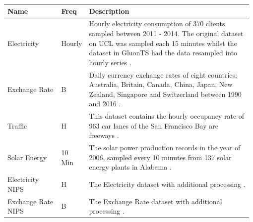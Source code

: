 \begin{table}[h]
    \centering
    \begin{tabular}{p{0.22\linewidth} | p{0.09\linewidth} | p{0.67\linewidth}}
        Name               & Freq   & Description                                                                                                                                                                                                                                                       \\ \hline
        Electricity        & Hourly & Hourly electricity consumption of 370 clients sampled between 2011 - 2014. The original dataset on UCL was sampled each 15 minutes whilst the dataset in GluonTS had the data resampled into hourly series \cite{gluonts-website, salinas_high-dimensional_2019}. \\
        \hline
        Exchange Rate      & B      & Daily currency exchange rates of eight countries; Australia, Britain, Canada, China, Japan, New Zealand, Singapore and Switzerland between 1990 and 2016  \cite{lai_modeling_2018}.                                                                               \\
        \hline
        Traffic            & H      & This dataset contains the hourly occupancy rate of 963 car lanes of the San Francisco Bay are freeways \cite{gluonts-github}.                                                                                                                                     \\
        \hline
        Solar Energy       & 10 Min & The solar power production records in the year of 2006, sampled every 10 minutes from 137 solar energy plants in Alabama \cite{lai_modeling_2018}.                                                                                                                \\
        \hline
        Electricity NIPS   & H      & The Electricity dataset with additional processing \cite{salinas_high-dimensional_2019}.                                                                                                                                                                          \\
        \hline
        Exchange Rate NIPS & B      & The Exchange Rate dataset with additional processing \cite{salinas_high-dimensional_2019}.                                                                                                                                                                        \\

\end{tabular}
\end{table}
